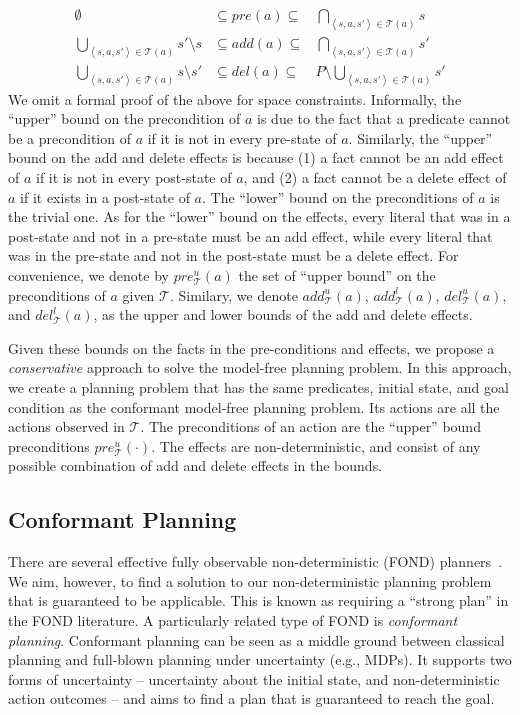 \documentclass[letterpaper]{article}
\newcommand{\tuple}[1]{\ensuremath{\left \langle #1 \right \rangle }}
\begin{document}
    \begin{align}
     \emptyset & \subseteq pre(a) \subseteq & \bigcap_{\tuple{s, a, s'}\in \mathcal{T}(a)} s \\
     \bigcup_{\tuple{s, a, s'}\in \mathcal{T}(a)} s'\setminus s  & \subseteq add(a) \subseteq & \bigcap_{\tuple{s, a, s'}\in \mathcal{T}(a)} s' \\
     \bigcup_{\tuple{s, a, s'}\in \mathcal{T}(a)} s\setminus s' & \subseteq del(a) \subseteq & P\setminus \bigcup_{\tuple{s, a, s'}\in \mathcal{T}(a)} s'  
     \label{eq:bounds}
    \end{align}
    We omit a formal proof of the above for space constraints. Informally, the ``upper'' bound on the precondition of $a$ is due to the fact that a predicate cannot be a precondition of $a$ if it is not in every pre-state of $a$. Similarly, the ``upper'' bound on the add and delete effects is because (1) a fact cannot be an add effect of $a$ if it is not in every post-state of $a$, and (2) a fact cannot be a delete effect of $a$ if it exists in a post-state of $a$. 
    The ``lower'' bound on the preconditions of $a$ is the trivial one. 
	As for the ``lower'' bound on the effects, every literal that was in a post-state and not in a pre-state must be an add effect, while every literal that was in the pre-state and not in the post-state must be a delete effect. 
	For convenience, we denote by $pre_\mathcal{T}^u(a)$ the set of ``upper bound'' on the preconditions of $a$ given $\mathcal{T}$. Similary, we denote $add_\mathcal{T}^u(a)$, $add_\mathcal{T}^l(a)$, $del_\mathcal{T}^u(a)$, and $del_\mathcal{T}^l(a)$, as the upper and lower bounds of the add and delete effects. 


Given these bounds on the facts in the pre-conditions and effects, we propose a {\em conservative} approach to solve the model-free planning problem. In this approach, we create a planning problem that has the same predicates, initial state, and goal condition as the conformant model-free planning problem. Its actions are all the actions observed in $\mathcal{T}$. The preconditions of an action are the ``upper'' bound preconditions $pre_\mathcal{T}^u(\cdot)$. The effects are non-deterministic, and consist of any possible combination of add and delete effects in the bounds. 

\subsection{Conformant Planning}
There are several effective fully observable non-deterministic (FOND) planners~\cite{cimatti2003weak,kissmann2009solving}. We aim, however, to find a  solution to our non-deterministic planning problem that is guaranteed to be applicable. This is known as requiring a ``strong plan'' in the FOND literature. A particularly related type of FOND is {\em conformant planning}. Conformant planning can be seen as a middle ground between classical planning and full-blown planning under uncertainty (e.g., MDPs). It supports two forms of uncertainty -- uncertainty about the initial state, and non-deterministic action outcomes -- and aims to find a plan that is guaranteed to reach the goal.
\end{document}
